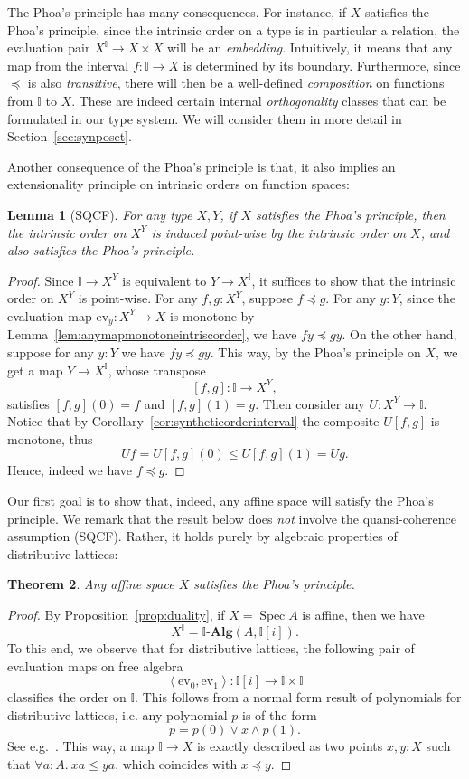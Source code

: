 \documentclass[12pt]{amsart}
\newtheorem{theorem}{Theorem}[section]
\newtheorem{lemma}[theorem]{Lemma}
\theoremstyle{definition}
\newcommand{\mb}[1]{\mathbf{#1}}
\newcommand{\mbb}[1]{\mathbb{#1}}
\newcommand{\I}{\mbb I}
\newcommand{\alg}{\text{-}\mb{Alg}}
\newcommand{\pair}[1]{\left\langle#1\right\rangle}
\newcommand{\ev}{\mathrm{ev}}
\newcommand{\fa}[2]{\forall #1\!\colon\!\!#2.\ }
\newcommand{\spec}{\operatorname{Spec}}
\begin{document}
The Phoa's principle has many consequences. For instance, if $X$ satisfies the Phoa's principle, since the intrinsic order on a type is in particular a relation, the evaluation pair $X^\I \to X \times X$ will be an \emph{embedding}. Intuitively, it means that any map from the interval $f : \I \to X$ is determined by its boundary. Furthermore, since $\preceq$ is also \emph{transitive}, there will then be a well-defined \emph{composition} on functions from $\I$ to $X$. These are indeed certain internal \emph{orthogonality} classes that can be formulated in our type system. We will consider them in more detail in Section~\ref{sec:synposet}.

Another consequence of the Phoa's principle is that, it also implies an extensionality principle on intrinsic orders on function spaces:

\begin{lemma}[SQCF]\label{lem:phoaexponential}
  For any type $X,Y$, if $X$ satisfies the Phoa's principle, then the intrinsic order on $X^Y$ is induced point-wise by the intrinsic order on $X$, and also satisfies the Phoa's principle.
\end{lemma}
\begin{proof}
  Since $\I \to X^Y$ is equivalent to $Y \to X^\I$, it suffices to show that the intrinsic order on $X^Y$ is point-wise. For any $f,g : X^Y$, suppose $f \preceq g$. For any $y : Y$, since the evaluation map $\ev_y : X^Y \to X$ is monotone by Lemma~\ref{lem:anymapmonotoneintriscorder}, we have $fy \preceq gy$. On the other hand, suppose for any $y : Y$ we have $fy \preceq gy$. This way, by the Phoa's principle on $X$, we get a map $Y \to X^\I$, whose transpose 
  \[ [f,g] : \I \to X^Y, \]
  satisfies $[f,g](0) = f$ and $[f,g](1) = g$. Then consider any $U : X^Y \to \I$. Notice that by Corollary~\ref{cor:syntheticorderinterval} the composite $U[f,g]$ is monotone, thus
  \[ Uf = U[f,g](0) \le U[f,g](1) = Ug. \]
  Hence, indeed we have $f \preceq g$.
\end{proof}

Our first goal is to show that, indeed, any affine space will satisfy the Phoa's principle. We remark that the result below does \emph{not} involve the quansi-coherence assumption (SQCF). Rather, it holds purely by algebraic properties of distributive lattices:

\begin{theorem}\label{thm:phoaaffine}
  Any affine space $X$ satisfies the Phoa's principle.
\end{theorem}
\begin{proof}
  By Proposition~\ref{prop:duality}, if $X = \spec A$ is affine, then we have
  \[ X^\I = \I\alg(A,\I[i]). \]
  To this end, we observe that for distributive lattices, the following pair of evaluation maps on free algebra
  \[ \pair{\ev_0,\ev_1} : \I[i] \to \I \times \I \]
  classifies the order on $\I$. This follows from a normal form result of polynomials for distributive lattices, i.e. any polynomial $p$ is of the form 
  \[ p = p(0) \vee x \wedge p(1). \]
  See e.g.~\cite[Thm. 10.11]{lausch2000algebra}. This way, a map $\I \to X$ is exactly described as two points $x,y : X$ such that $\fa aA xa \le ya$, which coincides with $x \preceq y$.
\end{proof}
\end{document}
